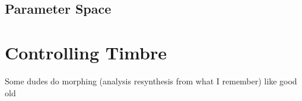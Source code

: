 	\subsection{Parameter Space}
	\label{sec:Timbre-ParameterSpaces}

\section{Controlling Timbre}
\label{sec:Timbre-Control}
	
	\note
	{
		Some dudes do morphing (analysis resynthesis from what I remember) like good old 
		\citet{williams2007perceptually, williams2009perceptually, williams2010perceptually}
	}
